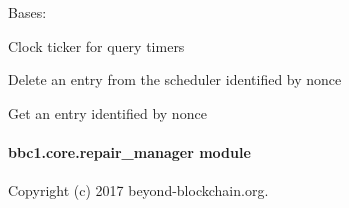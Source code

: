 \documentclass[letterpaper,10pt,english]{sphinxmanual}
\begin{document}
\begin{fulllineitems}
\label{\detokenize{bbc1.core.query_management:bbc1.core.query_management.Ticker}}
Bases: 

Clock ticker for query timers

\begin{fulllineitems}
\label{\detokenize{bbc1.core.query_management:bbc1.core.query_management.Ticker.del_entry}}
Delete an entry from the scheduler identified by nonce

\end{fulllineitems}


\begin{fulllineitems}
\label{\detokenize{bbc1.core.query_management:bbc1.core.query_management.Ticker.get_entry}}
Get an entry identified by nonce

\end{fulllineitems}


\end{fulllineitems}


\begin{fulllineitems}
\label{\detokenize{bbc1.core.query_management:bbc1.core.query_management.get_ticker}}
\end{fulllineitems}



\paragraph{bbc1.core.repair\_manager module}
\label{\detokenize{bbc1.core.repair_manager:bbc1-core-repair-manager-module}}\label{\detokenize{bbc1.core.repair_manager:module-bbc1.core.repair_manager}}\label{\detokenize{bbc1.core.repair_manager::doc}}
Copyright (c) 2017 beyond-blockchain.org.
\end{document}
